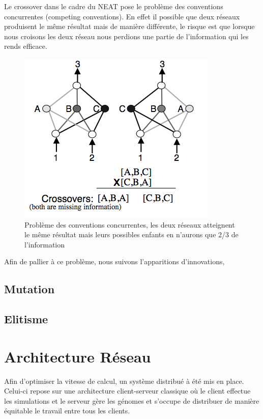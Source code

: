 \documentclass{article}
\begin{document}
Le crossover dans le cadre du NEAT pose le problème des conventions concurrentes (competing conventions). En effet il possible que deux réseaux produisent le même résultat mais de manière différente, le risque est que lorsque nous croisons les deux réseau nous perdions une partie de l'information qui les rends efficace.

\begin{figure}[h]
\begin{center}
	\includegraphics[scale=0.5]{competingconventions.png}
	\caption{Problème des conventions concurrentes, les deux réseaux atteignent le même résultat mais leurs possibles enfants en n'aurons que 2/3 de l'information \cite{neatpaper}}
\end{center}
\end{figure}
\newpage

Afin de pallier à ce problème, nous suivons l'apparitions d'innovations, 

\subsection{Mutation}
\subsection{Elitisme}

\newpage
\section{Architecture Réseau}

Afin d'optimiser la vitesse de calcul, un système distribué à été mis en place. Celui-ci repose sur une architecture client-serveur classique où le client effectue les simulations et le serveur gère les génomes et s'occupe de distribuer de manière équitable le travail entre tous les clients.\\
\end{document}
